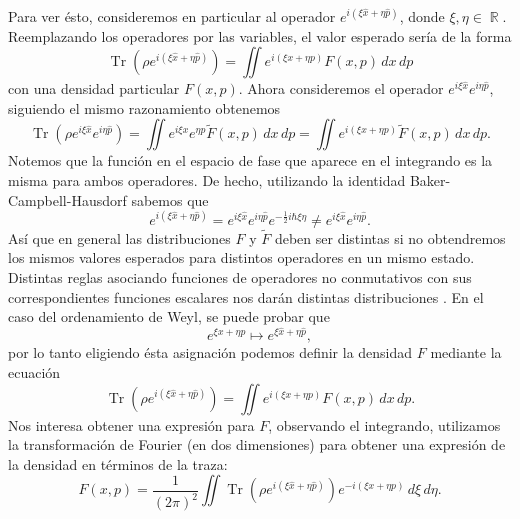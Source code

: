 \documentclass[a4paper]{report}
\DeclareMathOperator{\R}{\mathbb{R}}
\DeclareMathOperator{\Tr}{Tr}
\begin{document}
  Para ver ésto, consideremos en particular al operador
  $e^{i\left( \xi \hat{x} + \eta \hat{p} \right)}$, donde
  $\xi, \eta \in \R$. Reemplazando los operadores por las
  variables, el valor esperado sería de la forma
  \begin{equation}
    \Tr\left( \rho e^{i\left( \xi \hat{x} + \eta
    \hat{p} \right)} \right)
    = \iint e^{i\left( \xi x + \eta p \right)} F(x,p) \,
    dx \, dp
  \end{equation}
  con una densidad particular $F(x,p)$. Ahora consideremos
  el operador $e^{i\xi \hat{x}} e^{i\eta\hat{p}}$, siguiendo
  el mismo razonamiento obtenemos
  \begin{equation}
    \Tr\left(\rho e^{i\xi \hat{x}} e^{i\eta
    \hat{p}}\right)
    = \iint e^{i\xi x} e^{\eta p} \tilde F(x,p) \, dx \,
    dp
    = \iint e^{i\left( \xi x + \eta p \right)} \tilde
    F(x,p) \, dx \, dp.
  \end{equation}
  Notemos que la función en el espacio de fase que aparece
  en el integrando es la misma para ambos operadores. De
  hecho, utilizando la identidad Baker-Campbell-Hausdorf
  sabemos que
  \begin{equation}
    e^{i\left( \xi \hat{x} + \eta \hat{p} \right)}
    = e^{i\xi \hat{x}}e^{i\eta \hat{p}}e^{-\frac{1}{2}i\hbar
    \xi \eta}
    \neq e^{i\xi \hat{x}}e^{i\eta \hat{p}}.
  \end{equation}
  Así que en general las distribuciones $F$ y $\tilde F$
  deben ser distintas si no obtendremos los mismos valores
  esperados para distintos operadores en un mismo estado.
  Distintas reglas asociando funciones de operadores no
  conmutativos con sus correspondientes funciones escalares
  nos darán distintas distribuciones
  \cite{leeTheoryApplicationQuantum1995}. En el caso del
  ordenamiento de Weyl, se puede probar que 
  \[
    e^{\xi x + \eta p} \mapsto e^{\xi \hat{x} + \eta
    \hat{p}},
  \] 
  por lo tanto eligiendo ésta asignación podemos definir la
  densidad $F$ mediante la ecuación
  \begin{equation}
    \Tr\left(
      \rho e^{i(\xi \hat{x} + \eta \hat{p})}
    \right)
    = \iint e^{i(\xi x + \eta p)}F(x,p) \, dx \, dp.
  \end{equation}
  Nos interesa obtener una expresión para $F$, observando el
  integrando, utilizamos la transformación de Fourier (en
  dos dimensiones) para obtener una expresión de la densidad
  en términos de la traza:
  \begin{equation}
    \label{eqn:density_from_trace}
    F(x,p)
    = \frac{1}{(2\pi)^2} \iint \Tr\left( \rho 
      e^{i\left( \xi \hat{x} + \eta \hat{p} \right)} \right)
      e^{-i\left( \xi x + \eta p\right)} \, d\xi \, d\eta.
  \end{equation}
\end{document}
